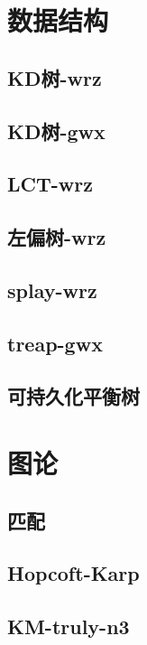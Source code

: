 \documentclass[titlepage,a4paper,10pt]{article}
\begin{document}
\begin{multicols}{2}
\begin{spacing}{0.8}
		\section{数据结构}
			\subsection{KD树-wrz}
				
			\subsection{KD树-gwx}
				
			\subsection{LCT-wrz}
				
			\subsection{左偏树-wrz}
				
			\subsection{splay-wrz}
				
			\subsection{treap-gwx}
				
			\subsection{可持久化平衡树}
				
		\section{图论}
			\subsection{匹配}
				
			\subsection{Hopcoft-Karp}
				
			\subsection{KM-truly-n3}
				

\end{spacing}
\end{multicols}
\end{document}
